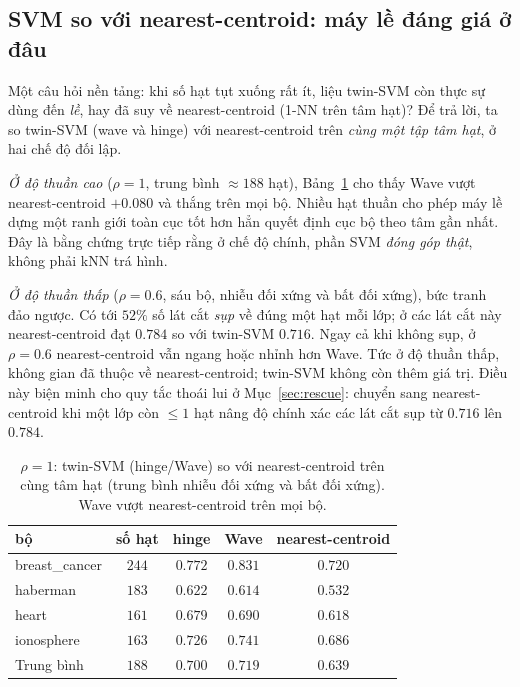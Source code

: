 \documentclass[11pt,a4paper]{article}
\begin{document}
\subsection{SVM so với nearest-centroid: máy lề đáng giá ở đâu}
\label{sec:nc}
Một câu hỏi nền tảng: khi số hạt tụt xuống rất ít, liệu twin-SVM còn thực sự dùng đến \emph{lề}, hay đã suy về nearest-centroid (1-NN trên tâm hạt)? Để trả lời, ta so twin-SVM (wave và hinge) với nearest-centroid trên \emph{cùng một tập tâm hạt}, ở hai chế độ đối lập.

\emph{Ở độ thuần cao} ($\rho=1$, trung bình $\approx 188$ hạt), Bảng~\ref{tab:nc} cho thấy Wave vượt nearest-centroid $+0.080$ và thắng trên mọi bộ. Nhiều hạt thuần cho phép máy lề dựng một ranh giới toàn cục tốt hơn hẳn quyết định cục bộ theo tâm gần nhất. Đây là bằng chứng trực tiếp rằng ở chế độ chính, phần SVM \emph{đóng góp thật}, không phải kNN trá hình.

\emph{Ở độ thuần thấp} ($\rho=0.6$, sáu bộ, nhiễu đối xứng và bất đối xứng), bức tranh đảo ngược. Có tới $52\%$ số lát cắt \emph{sụp} về đúng một hạt mỗi lớp; ở các lát cắt này nearest-centroid đạt $0.784$ so với twin-SVM $0.716$. Ngay cả khi không sụp, ở $\rho=0.6$ nearest-centroid vẫn ngang hoặc nhỉnh hơn Wave. Tức ở độ thuần thấp, không gian đã thuộc về nearest-centroid; twin-SVM không còn thêm giá trị. Điều này biện minh cho quy tắc thoái lui ở Mục~\ref{sec:rescue}: chuyển sang nearest-centroid khi một lớp còn $\le 1$ hạt nâng độ chính xác các lát cắt sụp từ $0.716$ lên $0.784$.

\begin{table}[h]
\centering
\caption{$\rho=1$: twin-SVM (hinge/Wave) so với nearest-centroid trên cùng tâm hạt (trung bình nhiễu đối xứng và bất đối xứng). Wave vượt nearest-centroid trên mọi bộ.}
\label{tab:nc}
\begin{tabular}{lcccc}
\toprule
bộ & số hạt & hinge & Wave & nearest-centroid \\
\midrule
breast\_cancer & $244$ & $0.772$ & $\mathbf{0.831}$ & $0.720$ \\
haberman & $183$ & $0.622$ & $0.614$ & $0.532$ \\
heart & $161$ & $0.679$ & $\mathbf{0.690}$ & $0.618$ \\
ionosphere & $163$ & $0.726$ & $\mathbf{0.741}$ & $0.686$ \\
\midrule
Trung bình & $188$ & $0.700$ & $\mathbf{0.719}$ & $0.639$ \\
\bottomrule
\end{tabular}
\end{table}
\end{document}
